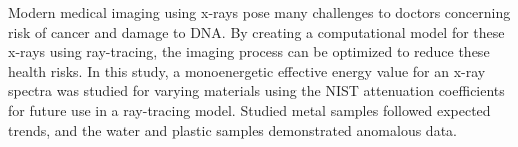 Modern medical imaging using x-rays pose many challenges to doctors concerning risk of cancer and damage to DNA. By creating a computational model for these x-rays using ray-tracing, the imaging process can be optimized to reduce these health risks. In this study, a monoenergetic effective energy value for an x-ray spectra was studied for varying materials using the NIST attenuation coefficients for future use in a ray-tracing model. Studied metal samples followed expected trends, and the water and plastic samples demonstrated anomalous data.
